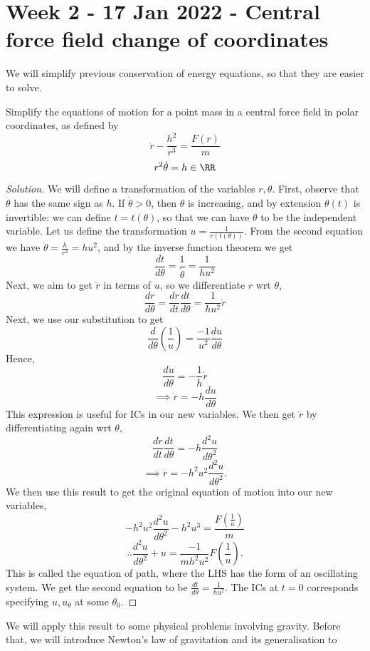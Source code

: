 \section{Week 2 - 17 Jan 2022 - Central force field change of coordinates }
We will simplify previous conservation of energy equations, so that they are
easier to solve.
\begin{exercise}
  Simplify the equations of motion for a point mass in a central force field in
  polar coordinates, as defined by 
  \[\ddot{r} - \frac{h^2}{r^3} = \frac{F(r)}{m}\]
  \[r^2\dot{\theta} = h\in\RR\]
  \label{exc:transformationCentralForceField}
\end{exercise}
\begin{proof}[Solution]
  We will define a transformation of the variables $r,\theta$. First, observe
  that $\dot{\theta}$ has the same sign as $h$. If $\dot{\theta}>0$, then
  $\theta$ is increasing, and by extension $\theta(t)$ is invertible: we can
  define $t=t(\theta)$, so that we can have $\theta$ to be the independent
  variable. Let us define the transformation $u=\frac{1}{r(t(\theta))}$. From
  the second equation we have $\dot{\theta}= \frac{h}{r^2}= hu^2$, and by the
  inverse function theorem we get
  \[\frac{dt}{d\theta} = \frac{1}{\dot{\theta}}= \frac{1}{hu^2}\]
  Next, we aim to get $\ddot{r}$ in terms of $u$, so we differentiate $r$ wrt
  $\theta$,
  \[\frac{dr}{d\theta} = \frac{dr}{dt} \frac{dt}{d\theta} =
  \frac{1}{hu^2}\dot{r}\]
  Next, we use our substitution to get 
  \[\frac{d}{d\theta}(\frac{1}{u}) = \frac{-1}{u^2}\frac{du}{d\theta}\]
  Hence,
  \[\frac{du}{d\theta} = -\frac{1}{h}\dot{r}\]
  \[\implies \dot{r}= -h\frac{du}{d\theta}\]
  This expression is useful for ICs in our new variables. We then get $\ddot{r}$
  by differentiating again wrt $\theta$,
  \[\frac{d\dot{r}}{dt}\frac{dt}{d\theta} = -h\frac{d^2u}{d\theta^2}\]
  \[\implies \ddot{r} = -h^2u^2 \frac{d^2u}{d\theta^2}.\]
  We then use this result to get the original equation of motion into our new
  variables,
  \[-h^2u^2 \frac{d^2u}{d\theta^2}- h^2u^3 =
  \frac{F(\frac{1}{u})}{m}\]
  \[\therefore \frac{d^2u}{d\theta^2} + u = \frac{-1}{mh^2u^2}
  F(\frac{1}{u}).\]
  This is called the equation of path, where the LHS has the form of an
  oscillating system. We get the second equation to be $\frac{dt}{d\theta}=
  \frac{1}{hu^2}$. The ICs at $t=0$ corresponds specifying $u,u_{\theta}$ at
  some $\theta_0$.
\end{proof}
We will apply this result to some physical problems involving gravity. Before
that, we will introduce Newton's law of gravitation and its generalisation to
